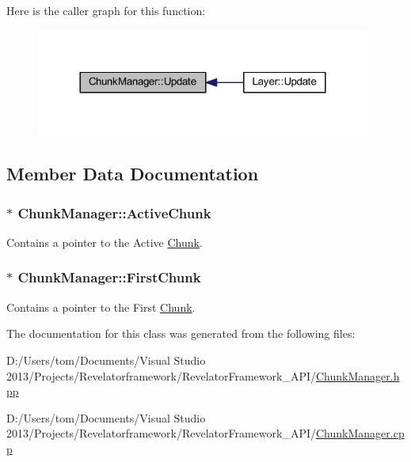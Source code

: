 Here is the caller graph for this function\-:\nopagebreak
\begin{figure}[H]
\begin{center}
\leavevmode
\includegraphics[width=312pt]{class_chunk_manager_a1c6b1c312b12233d18c2bad68b933cdf_icgraph}
\end{center}
\end{figure}




\subsection{Member Data Documentation}
\hypertarget{class_chunk_manager_a8008f62926fe10f46ac59001aae2d372}{
\subsubsection[{Active\-Chunk}]{$\ast$ Chunk\-Manager\-::\-Active\-Chunk\hspace{0.3cm}{\ttfamily [private]}}}\label{class_chunk_manager_a8008f62926fe10f46ac59001aae2d372}


Contains a pointer to the Active \hyperlink{class_chunk}{Chunk}. 

\hypertarget{class_chunk_manager_afb87cd5dd3cb61f09a6038d1796719ba}{
\subsubsection[{First\-Chunk}]{$\ast$ Chunk\-Manager\-::\-First\-Chunk\hspace{0.3cm}{\ttfamily [private]}}}\label{class_chunk_manager_afb87cd5dd3cb61f09a6038d1796719ba}


Contains a pointer to the First \hyperlink{class_chunk}{Chunk}. 



The documentation for this class was generated from the following files\-:\begin{DoxyCompactItemize}
\item 
D\-:/\-Users/tom/\-Documents/\-Visual Studio 2013/\-Projects/\-Revelatorframework/\-Revelator\-Framework\-\_\-\-A\-P\-I/\hyperlink{_chunk_manager_8hpp}{Chunk\-Manager.\-hpp}\item 
D\-:/\-Users/tom/\-Documents/\-Visual Studio 2013/\-Projects/\-Revelatorframework/\-Revelator\-Framework\-\_\-\-A\-P\-I/\hyperlink{_chunk_manager_8cpp}{Chunk\-Manager.\-cpp}\end{DoxyCompactItemize}
